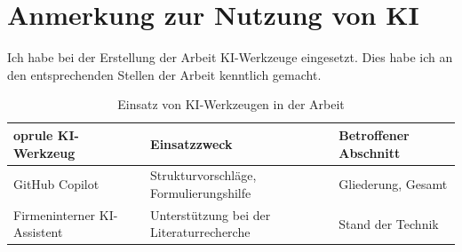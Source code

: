 
\chapter*{Anmerkung zur Nutzung von KI}
Ich habe bei der Erstellung der Arbeit KI-Werkzeuge eingesetzt. Dies habe ich an den entsprechenden Stellen der Arbeit kenntlich gemacht.

\begin{table}[H]
	\centering
	\captionsetup{list=no}
	\caption{Einsatz von KI-Werkzeugen in der Arbeit}
	\begin{tabularx}{\textwidth}{@{}p{3cm}p{4.5cm}X@{}}
		oprule
		\textbf{KI-Werkzeug} & \textbf{Einsatzzweck} & \textbf{Betroffener Abschnitt} \\
	\midrule
		GitHub Copilot & Strukturvorschläge, Formulierungshilfe & Gliederung, Gesamt \\
	\addlinespace
		Firmeninterner KI-Assistent & Unterstützung bei der Literaturrecherche & Stand der Technik \\
	\bottomrule
	\end{tabularx}
\end{table}
